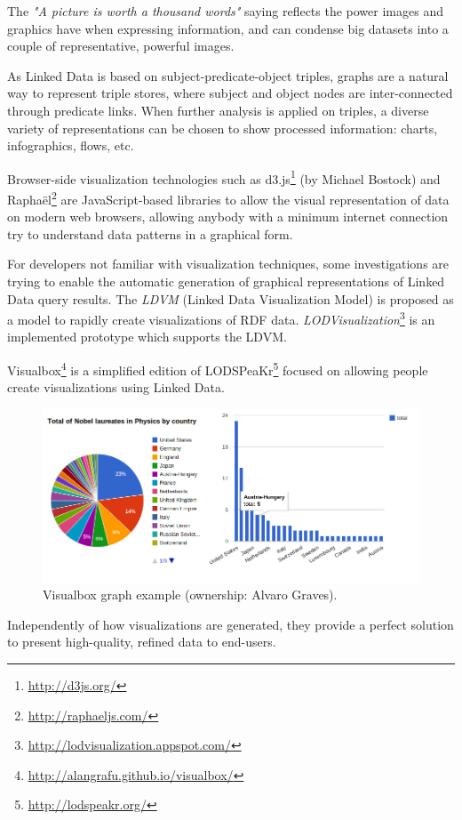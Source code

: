 The \textit{"A picture is worth a thousand words"} saying reflects the power images and graphics have when expressing information, and can condense big datasets into a couple of representative, powerful images.

As Linked Data is based on subject-predicate-object triples, graphs are a natural way to represent triple stores, where subject and object nodes are inter-connected through predicate links. When further analysis is applied on triples, a diverse variety of representations can be chosen to show processed information: charts, infographics, flows, etc.\cite{khan2011data}

Browser-side visualization technologies such as d3.js\footnote{\url{http://d3js.org/}} (by Michael Bostock) and Raphaël\footnote{\url{http://raphaeljs.com/}} are JavaScript-based libraries to allow the visual representation of data on modern web browsers, allowing anybody with a minimum internet connection try to understand data patterns in a graphical form.

For developers not familiar with visualization techniques, some investigations are trying to enable the automatic generation of graphical representations of Linked Data query results. The \textit{LDVM} (Linked Data Visualization Model) \cite{brunetti2012linked} is proposed as a model to rapidly create visualizations of RDF data. \textit{LODVisualization}\footnote{\url{http://lodvisualization.appspot.com/}} is an implemented prototype which supports the LDVM.

Visualbox\footnote{\url{http://alangrafu.github.io/visualbox/}} is a simplified edition of LODSPeaKr\footnote{\url{http://lodspeakr.org/}} focused on allowing people create visualizations using Linked Data.

\begin{figure}
    \center
    \includegraphics[width=\textwidth]{img/ld_approach/graph.png}
    \caption{Visualbox graph example (ownership: Alvaro Graves).}
\end{figure}

Independently of how visualizations are generated, they provide a perfect solution to present high-quality, refined data to end-users.

